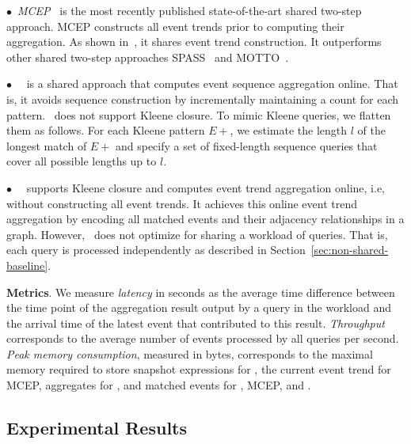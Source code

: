 $\bullet$~\textit{MCEP}~\cite{KS19} is the most recently published state-of-the-art shared two-step approach. MCEP constructs all event trends prior to computing their aggregation. As shown in~\cite{KS19}, it shares event trend construction. It outperforms other shared two-step approaches SPASS~\cite{RLR16} and MOTTO~\cite{ZVDH17}.

$\bullet$~\textit{\sharon}~\cite{PRLRM18} is a shared approach that computes event sequence aggregation online. That is, it avoids sequence construction by incrementally maintaining a count for each pattern. \sharon\ does not support Kleene closure. To mimic Kleene queries, we flatten them as follows. For each Kleene pattern $E+$, we estimate the length $l$ of the longest match of $E+$ and specify a set of fixed-length sequence queries that cover all possible lengths up to $l$. 

$\bullet$~\textit{\greta}~\cite{PLRM18} supports Kleene closure and computes event trend aggregation online, i.e, without constructing all event trends. It achieves this online event trend aggregation by encoding all matched events and their adjacency relationships in a graph. However, \greta\ does not optimize for sharing a workload of queries. That is, each query is processed independently as described in Section~\ref{sec:non-shared-baseline}.

\textbf{Metrics}.
%
We measure \textit{latency} in seconds as the average time difference between the time point of the aggregation result output by a query in the workload and the arrival time of the latest event that contributed to this result.
%
\textit{Throughput} corresponds to the average number of events processed by all queries per second.
%
\textit{Peak memory consumption}, measured in bytes, corresponds to the maximal memory required to store snapshot expressions for \app, the current event trend for MCEP, aggregates for \sharon, and matched events for \app, MCEP, and \greta.


\subsection{Experimental Results}
\label{sec:exp_results}



